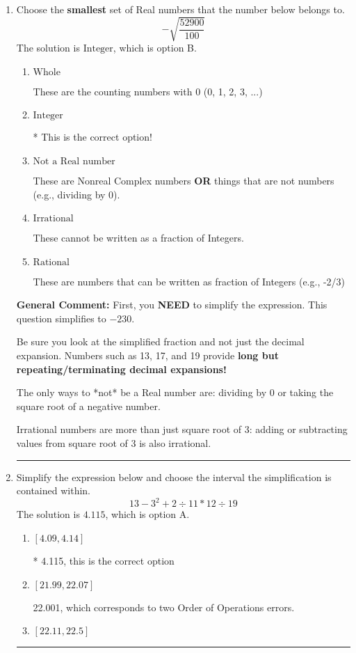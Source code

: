 \documentclass{extbook}[14pt]
\newcommand{\litem}[1]{\item #1

\rule{\textwidth}{0.4pt}}
\begin{document}
\begin{enumerate}\litem{
Choose the \textbf{smallest} set of Real numbers that the number below belongs to.
\[ -\sqrt{\frac{52900}{100}} \]The solution is \( \text{Integer} \), which is option B.\begin{enumerate}[label=\Alph*.]
\item \( \text{Whole} \)

These are the counting numbers with 0 (0, 1, 2, 3, ...)
\item \( \text{Integer} \)

* This is the correct option!
\item \( \text{Not a Real number} \)

These are Nonreal Complex numbers \textbf{OR} things that are not numbers (e.g., dividing by 0).
\item \( \text{Irrational} \)

These cannot be written as a fraction of Integers.
\item \( \text{Rational} \)

These are numbers that can be written as fraction of Integers (e.g., -2/3)
\end{enumerate}

\textbf{General Comment:} First, you \textbf{NEED} to simplify the expression. This question simplifies to $-230$. 
 
 Be sure you look at the simplified fraction and not just the decimal expansion. Numbers such as 13, 17, and 19 provide \textbf{long but repeating/terminating decimal expansions!} 
 
 The only ways to *not* be a Real number are: dividing by 0 or taking the square root of a negative number. 
 
 Irrational numbers are more than just square root of 3: adding or subtracting values from square root of 3 is also irrational.
}
\litem{
Simplify the expression below and choose the interval the simplification is contained within.
\[ 13 - 3^2 + 2 \div 11 * 12 \div 19 \]The solution is \( 4.115 \), which is option A.\begin{enumerate}[label=\Alph*.]
\item \( [4.09, 4.14] \)

* 4.115, this is the correct option
\item \( [21.99, 22.07] \)

 22.001, which corresponds to two Order of Operations errors.
\item \( [22.11, 22.5] \)


\end{enumerate}}
\end{enumerate}
\end{document}
